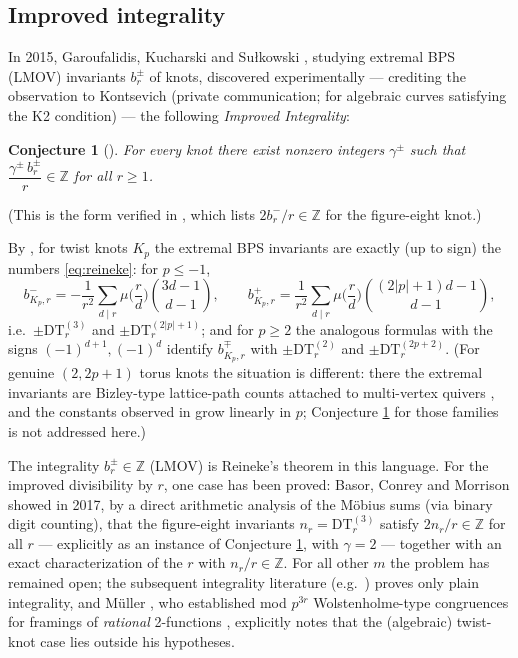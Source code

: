 \documentclass[11pt]{amsart}
\newtheorem{conjecture}[theorem]{Conjecture}
\theoremstyle{definition}
\newcommand{\ZZ}{\mathbb{Z}}
\newcommand{\DT}{\mathrm{DT}}
\begin{document}
\subsection{Improved integrality}
In 2015, Garoufalidis, Kucharski and Su\l kowski \cite{GKS}, studying extremal BPS (LMOV) invariants $b^{\pm}_r$ of knots, discovered experimentally --- crediting the observation to Kontsevich (private communication; for algebraic curves satisfying the K2 condition) --- the following \emph{Improved Integrality}:

\begin{conjecture}[{\cite[Conj.~1.3]{GKS}}]\label{conj:GKS}
For every knot there exist nonzero integers $\gamma^{\pm}$ such that
$\dfrac{\gamma^{\pm}\, b^{\pm}_r}{r}\in\ZZ$ for all $r\ge1$.
\end{conjecture}

\noindent(This is the form verified in \cite[Table~2]{GKS}, which lists $2b^-_r/r\in\ZZ$ for the figure-eight knot.)

By \cite[Prop.~1.2]{GKS}, for twist knots $K_p$ the extremal BPS invariants are exactly (up to sign) the numbers \eqref{eq:reineke}: for $p\le -1$,
\[
b^-_{K_p,r}=-\frac1{r^2}\sum_{d\mid r}\mu\Big(\frac rd\Big)\binom{3d-1}{d-1},\qquad
b^+_{K_p,r}=\frac1{r^2}\sum_{d\mid r}\mu\Big(\frac rd\Big)\binom{(2|p|+1)d-1}{d-1},
\]
i.e.\ $\pm\DT^{(3)}_r$ and $\pm\DT^{(2|p|+1)}_r$; and for $p\ge2$ the analogous formulas with the signs $(-1)^{d+1},(-1)^d$ identify $b^{\mp}_{K_p,r}$ with $\pm\DT^{(2)}_r$ and $\pm\DT^{(2p+2)}_r$. (For genuine $(2,2p+1)$ torus knots the situation is different: there the extremal invariants are Bizley-type lattice-path counts attached to multi-vertex quivers \cite{PSS}, and the constants observed in \cite[Table~1]{GKS} grow linearly in $p$; Conjecture \ref{conj:GKS} for those families is not addressed here.)

The integrality $b_r^\pm\in\ZZ$ (LMOV) is Reineke's theorem in this language. For the improved divisibility by $r$, one case has been proved: Basor, Conrey and Morrison \cite{BCM} showed in 2017, by a direct arithmetic analysis of the M\"obius sums (via binary digit counting), that the figure-eight invariants $n_r=\DT^{(3)}_r$ satisfy $2n_r/r\in\ZZ$ for all $r$ --- explicitly as an instance of Conjecture \ref{conj:GKS}, with $\gamma=2$ --- together with an exact characterization of the $r$ with $n_r/r\in\ZZ$. For all other $m$ the problem has remained open; the subsequent integrality literature (e.g.\ \cite{LuoZhu, WangZhu}) proves only plain integrality, and M\"uller \cite{Muller}, who established mod $p^{3r}$ Wolstenholme-type congruences for framings of \emph{rational} 2-functions \cite{SVW}, explicitly notes that the (algebraic) twist-knot case lies outside his hypotheses.
\end{document}
